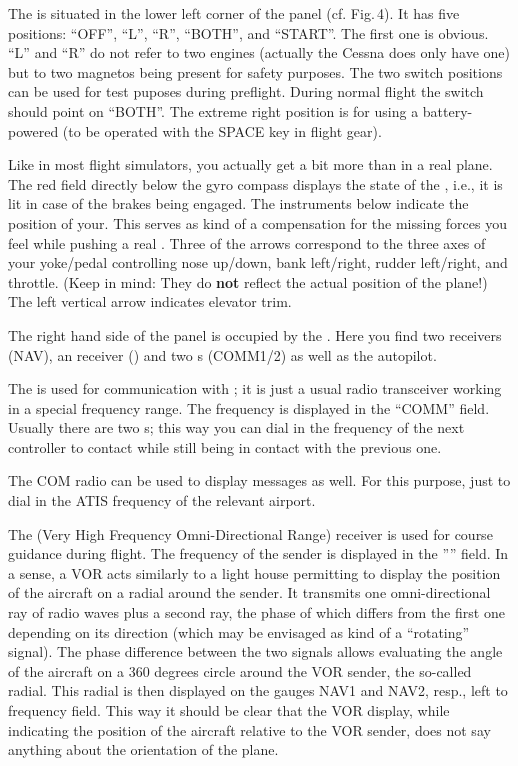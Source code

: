 The  is situated in the lower left corner of the
panel (cf. Fig.\,4). It has five positions: ``OFF'', ``L'', ``R'',
``BOTH'', and ``START''. The first one is obvious. ``L'' and ``R'' do
not refer to two engines (actually the Cessna does only have one) but
to two magnetos being present for safety purposes. The two switch
positions can be used for test puposes during preflight. During normal
flight the switch should point on ``BOTH''. The extreme right position
is for  using a battery-powered
 (to be operated with the SPACE key in flight gear).

Like in most flight simulators, you actually get a bit more than in a
real plane. The red field directly below the gyro compass displays the
state of the , i.e., it is lit in case of the brakes
being engaged. The instruments below indicate the position of
your. This serves as kind of a compensation for the missing
forces you feel while pushing a real . Three of the arrows
correspond to the three axes of your yoke/pedal controlling nose
up/down, bank left/right, rudder left/right, and throttle. (Keep in
mind: They do \textbf{not} reflect the actual position of the plane!)
The left vertical arrow indicates elevator trim.

The right hand side of the panel is occupied by the . Here
you find
two  receivers (NAV), an  receiver
() and two s
(COMM1/2) as
well as the autopilot.

The  is used for communication with ; it is just a usual radio transceiver working in a special frequency
range.
The frequency is displayed in the ``COMM'' field. Usually there are two
s; this way you can dial in the frequency of the next controller to
contact
while still being in contact with the previous one.

The COM radio can be used to display  messages as well. For
this purpose, just to dial in the ATIS frequency of the relevant
airport.

The  (Very High Frequency Omni-Directional Range) receiver is used
for course
guidance during flight. The frequency of the sender is displayed in the
'''' field. In a sense, 
a VOR acts similarly to a light house permitting to display the position of the
aircraft on a radial around the sender. It transmits one omni-directional ray of
radio
waves plus a second ray, the phase of which differs from the first one depending
on its
direction (which may be envisaged as kind of a ``rotating'' signal). The phase
difference between the two 
signals allows evaluating the angle of the aircraft on a 360 degrees circle
around the VOR sender, the so-called radial. This radial is then displayed on
the gauges
NAV1 and NAV2, resp., left to frequency field. This way it should be clear that
the VOR display, while 
indicating the position of the aircraft relative to the VOR sender, does not say
anything about the orientation of the plane. 

